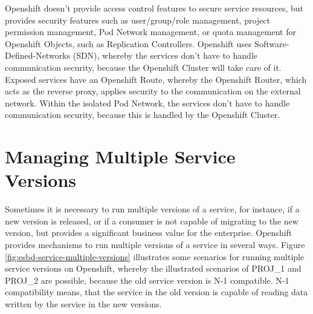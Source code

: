 Openshift doesn't provide access control features to secure service resources, but provides security features such as user/group/role management, project permission management, Pod Network management, or quota management for Openshift Objects, such as Replication Controllers. Openshift uses Software-Defined-Networks (SDN), whereby 
the services don't have to handle communication security, because the Openshift Cluster will take care of it. Exposed services have an Openshift Route, whereby the Openshift Router, which acts as the reverse proxy, applies security to the communication on the external network. Within the isolated Pod Network, the services don't have to handle communication security, because this is handled by the Openshift Cluster. 

\section{Managing Multiple Service Versions}
\label{sec:esbd-multi-version-service}
Sometimes it is necessary to run multiple versions of a service, for instance, if a new version is released, or if a consumer is not capable of migrating to the new version, but provides a significant business value for the enterprise. Openshift provides mechanisms to run multiple versions of a service in several ways. Figure \vref{fig:esbd-service-multiple-versions} illustrates some scenarios for running multiple service versions on Openshift, whereby the illustrated scenarios of PROJ\_1 and PROJ\_2 are possible, because the old service version is N-1 compatible. N-1 compatibility means, that the service in the old version is capable of reading data written by the service in the new versions.
\newpage

